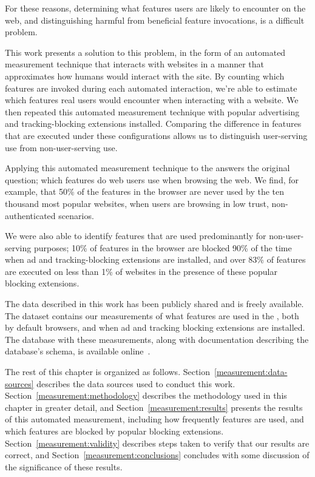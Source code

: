 For these reasons, determining what \WAPI features users are likely
to encounter on the web, and distinguishing harmful from beneficial feature
invocations, is a difficult problem.

This work presents a solution to this problem, in the form of an automated
measurement technique that interacts with websites in a manner that
approximates how humans would interact with the site.  By counting which
features are invoked during each automated interaction, we're able to estimate
which features real users would encounter when interacting with a website. We
then repeated this automated measurement technique with popular advertising and
tracking-blocking extensions installed.  Comparing the difference in
features that are executed under these configurations allows us to
distinguish user-serving \WAPI use from non-user-serving \WAPI use.

Applying this automated measurement technique to the \ATK answers the original
question; which \WAPI features do web users use when browsing the web.  We
find, for example, that 50\% of the \WAPI features in the browser are never
used by the ten thousand most popular websites, when users are browsing in low
trust, non-authenticated scenarios.

We were also able to identify features that are used
predominantly for non-user-serving purposes; 10\% of \WAPI features in the
browser are blocked 90\% of the time when ad and tracking-blocking extensions
are installed,  and over 83\% of features are executed on less than 1\% of
websites in the presence of these popular blocking extensions.

The data described in this work has been publicly shared and is freely
available.  The dataset contains our measurements of what \JS features are used
in the \ATK, both by default browsers, and when ad and tracking blocking
extensions are installed.  The database with these measurements, along with
documentation describing the database's schema, is available
online~\cite{snyderp2016webapidata}.

The rest of this chapter is organized as follows.
Section~\ref{measurement:data-sources} describes the data sources used to
conduct this work. Section~\ref{measurement:methodology} describes the
methodology used in this chapter in greater detail, and
Section~\ref{measurement:results} presents the results of this automated
measurement, including how frequently features are used, and which features are
blocked by popular blocking extensions.  Section~\ref{measurement:validity}
describes steps taken to verify that our results are correct, and
Section~\ref{measurement:conclusions} concludes with some discussion of the
significance of these results.
